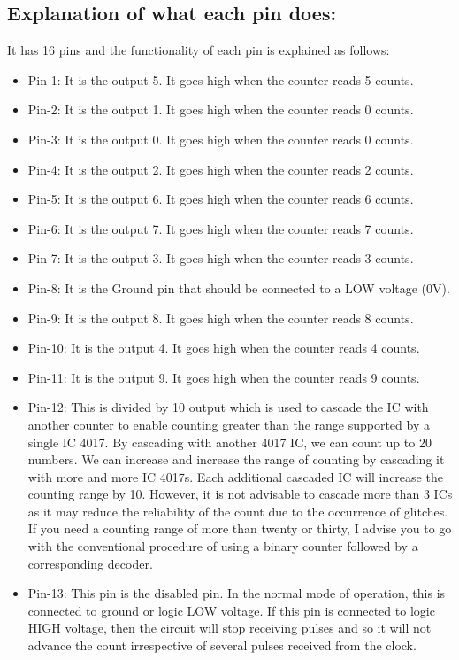\documentclass[pstricks,border=11pt]{article}
\begin{document}
\subsection{Explanation of what each pin does:}
It has 16 pins and the functionality of each pin is explained as follows:
\begin{itemize}
    \item Pin-1: It is the output 5. It goes high when the counter reads 5 counts.
    \item Pin-2: It is the output 1. It goes high when the counter reads 0 counts.
    \item Pin-3: It is the output 0. It goes high when the counter reads 0 counts.
    \item Pin-4: It is the output 2. It goes high when the counter reads 2 counts.
    \item Pin-5: It is the output 6. It goes high when the counter reads 6 counts.
    \item Pin-6: It is the output 7. It goes high when the counter reads 7 counts.
    \item Pin-7: It is the output 3. It goes high when the counter reads 3 counts.
    \item Pin-8: It is the Ground pin that should be connected to a LOW voltage (0V).
    \item Pin-9: It is the output 8. It goes high when the counter reads 8 counts.
    \item Pin-10: It is the output 4. It goes high when the counter reads 4 counts.
    \item Pin-11: It is the output 9. It goes high when the counter reads 9 counts.
    \item Pin-12: This is divided by 10 output which is used to cascade the IC with another counter to enable counting greater than the range supported by a single IC 4017. By cascading with another 4017 IC, we can count up to 20 numbers. We can increase and increase the range of counting by cascading it with more and more IC 4017s. Each additional cascaded IC will increase the counting range by 10. However, it is not advisable to cascade more than 3 ICs as it may reduce the reliability of the count due to the occurrence of glitches. If you need a counting range of more than twenty or thirty, I advise you to go with the conventional procedure of using a binary counter followed by a corresponding decoder.
    \item Pin-13: This pin is the disabled pin. In the normal mode of operation, this is connected to ground or logic LOW voltage. If this pin is connected to logic HIGH voltage, then the circuit will stop receiving pulses and so it will not advance the count irrespective of several pulses received from the clock.

\end{itemize}
\end{document}
